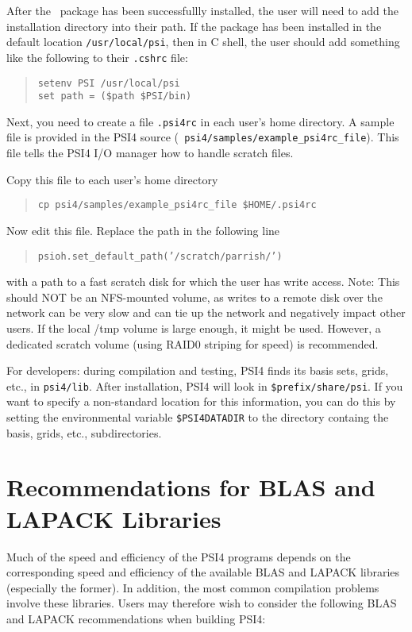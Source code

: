 \documentclass[12pt]{article}
\begin{document}
After the \PSIfour\ package has been successfullly installed, the user will
need to add the installation directory into their path.  If the package
has been installed in the default location {\tt /usr/local/psi}, then
in C shell, the user should add something like the following to 
their {\tt .cshrc} file:
\begin{quotation}
\noindent
{\tt setenv PSI /usr/local/psi} \\
{\tt set path = (\$path \$PSI/bin)}
\end{quotation}

Next, you need to create a file {\tt .psi4rc} in each user's home
directory.  A sample file is provided in the PSI4 source ({\tt
psi4/samples/example\_psi4rc\_file}).  This file tells the PSI4 I/O
manager how to handle scratch files.

Copy this file to each user's home directory

\begin{quotation}
{\tt cp psi4/samples/example\_psi4rc\_file \$HOME/.psi4rc}
\end{quotation}

Now edit this file.  Replace the path in the following line

\begin{quotation}
{\tt psioh.set\_default\_path('/scratch/parrish/')}
\end{quotation}
with a path to a fast scratch disk for which the user has write access.  Note:
This should NOT be an NFS-mounted volume, as writes to a remote disk over the
network can be very slow and can tie up the network and negatively impact
other users.  If the local /tmp volume is large enough, it might be used.
However, a dedicated scratch volume (using RAID0 striping for speed) is
recommended.

For developers: during compilation and testing, PSI4 finds its
basis sets, grids, etc., in {\tt psi4/lib}.  After installation,
PSI4 will look in {\tt \$prefix/share/psi}.  If you want to specify a
non-standard location for this information, you can do this by setting
the environmental variable {\tt \$PSI4DATADIR} to the directory containg
the basis, grids, etc., subdirectories.


\section{Recommendations for BLAS and LAPACK Libraries}

Much of the speed and efficiency of the PSI4 programs depends on the
corresponding speed and efficiency of the available BLAS and LAPACK
libraries (especially the former).  In addition, the most common
compilation problems involve these libraries.  Users may therefore
wish to consider the following BLAS and LAPACK recommendations when
building PSI4:
\end{document}
